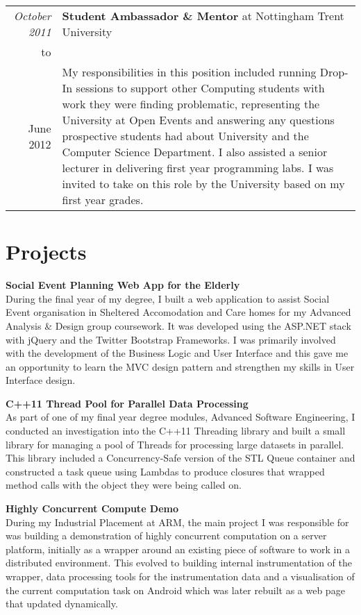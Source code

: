 \documentclass[a4paper,10pt]{article} %
\begin{document}
\begin{longtable}{r|p{16cm}}
\emph{October 2011} & \textbf{Student Ambassador \& Mentor} at Nottingham Trent University \\
to & \\
June 2012 & My responsibilities in this position included running Drop-In sessions to support other Computing students with work they were finding problematic, representing the University at Open Events and answering any questions prospective students had about University and the Computer Science Department. I also assisted a senior lecturer in delivering first year programming labs. I was invited to take on this role by the University based on my first year grades. \\

\end{longtable}
\pagebreak
\section{Projects}
\textbf{Social Event Planning Web App for the Elderly} \\
During the final year of my degree, I built a web application to assist Social Event organisation in Sheltered Accomodation and Care homes for my Advanced Analysis \& Design group coursework. It was developed using the ASP.NET stack with jQuery and the Twitter Bootstrap Frameworks. I was primarily involved with the development of the Business Logic and User Interface and this gave me an opportunity to learn the MVC design pattern and strengthen my skills in User Interface design. \\
\par

\textbf{C++11 Thread Pool for Parallel Data Processing} \\
As part of one of my final year degree modules, Advanced Software Engineering, I conducted an investigation into the C++11 Threading library and built a small library for managing a pool of Threads for processing large datasets in parallel. This library included a Concurrency-Safe version of the STL Queue container and constructed a task queue using Lambdas to produce closures that wrapped method calls with the object they were being called on. \\
\par

\textbf{Highly Concurrent Compute Demo} \\
During my Industrial Placement at ARM, the main project I was responsible for was building a demonstration of highly concurrent computation on a server platform, initially as a wrapper around an existing piece of software to work in a distributed environment. This evolved to building internal instrumentation of the wrapper, data processing tools for the instrumentation data and a visualisation of the current computation task on Android which was later rebuilt as a web page that updated dynamically. \\
\par
\end{document}
